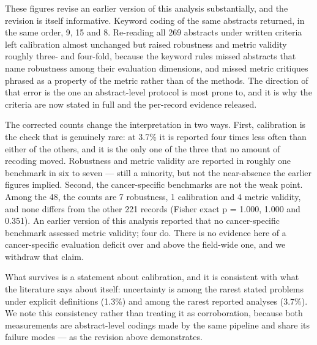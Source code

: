 \documentclass{article}
\begin{document}
These figures revise an earlier version of this analysis substantially,
and the revision is itself informative. Keyword coding of the same
abstracts returned, in the same order, 9, 15 and 8. Re-reading all 269
abstracts under written criteria left calibration almost unchanged but
raised robustness and metric validity roughly three- and four-fold,
because the keyword rules missed abstracts that name robustness among
their evaluation dimensions, and missed metric critiques phrased as a
property of the metric rather than of the methods. The direction of that
error is the one an abstract-level protocol is most prone to, and it is
why the criteria are now stated in full and the per-record evidence
released.

The corrected counts change the interpretation in two ways. First,
calibration is the check that is genuinely rare: at 3.7\% it is reported
four times less often than either of the others, and it is the only one
of the three that no amount of recoding moved. Robustness and metric
validity are reported in roughly one benchmark in six to seven --- still
a minority, but not the near-absence the earlier figures implied.
Second, the cancer-specific benchmarks are not the weak point. Among the
48, the counts are 7 robustness, 1 calibration and 4 metric validity,
and none differs from the other 221 records (Fisher exact p = 1.000,
1.000 and 0.351). An earlier version of this analysis reported that no
cancer-specific benchmark assessed metric validity; four do. There is no
evidence here of a cancer-specific evaluation deficit over and above the
field-wide one, and we withdraw that claim.

What survives is a statement about calibration, and it is consistent
with what the literature says about itself: uncertainty is among the
rarest stated problems under explicit definitions (1.3\%) and among the
rarest reported analyses (3.7\%). We note this consistency rather than
treating it as corroboration, because both measurements are
abstract-level codings made by the same pipeline and share its failure
modes --- as the revision above demonstrates.
\end{document}
